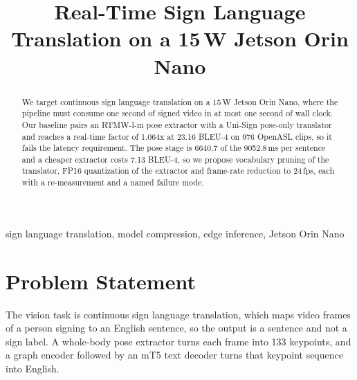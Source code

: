 \documentclass[conference]{IEEEtran}
\begin{document}
\title{Real-Time Sign Language Translation on a 15\,W Jetson Orin Nano}

\author{
\and
{}
}

\maketitle

\begin{abstract}
We target continuous sign language translation on a 15\,W Jetson Orin Nano, where the
pipeline must consume one second of signed video in at most one second of wall clock. Our
baseline pairs an RTMW-l-m pose extractor with a Uni-Sign pose-only translator and reaches
a real-time factor of 1.064x at 23.16 BLEU-4 on 976 OpenASL clips, so it fails the latency
requirement. The pose stage is 6640.7 of the 9052.8\,ms per sentence and a cheaper
extractor costs 7.13 BLEU-4, so we propose vocabulary pruning of the translator, FP16
quantization of the extractor and frame-rate reduction to 24\,fps, each with a
re-measurement and a named failure mode.
\end{abstract}

\begin{IEEEkeywords}
sign language translation, model compression, edge inference, Jetson Orin Nano
\end{IEEEkeywords}

\section{Problem Statement}

The vision task is continuous sign language translation, which maps video frames of a
person signing to an English sentence, so the output is a sentence and not a sign label. A
whole-body pose extractor turns each frame into 133 keypoints, and a graph encoder
followed by an mT5 text decoder turns that keypoint sequence into English.
\end{document}
